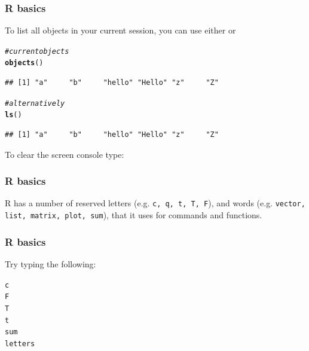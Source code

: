 \documentclass[12pt]{beamer}\usepackage[]{graphicx}\usepackage[]{color}
\makeatletter
\newcommand{\hlcom}[1]{\textcolor[rgb]{0.678,0.584,0.686}{\textit{#1}}}%
\newcommand{\hlstd}[1]{\textcolor[rgb]{0.345,0.345,0.345}{#1}}%
\newcommand{\hlkwd}[1]{\textcolor[rgb]{0.737,0.353,0.396}{\textbf{#1}}}%
\newenvironment{kframe}{%
 \def\at@end@of@kframe{}%
 \ifinner\ifhmode%
  \def\at@end@of@kframe{\end{minipage}}%
  \begin{minipage}{\columnwidth}%
 \fi\fi%
 \def\FrameCommand##1{\hskip\@totalleftmargin \hskip-\fboxsep
 \colorbox{shadecolor}{##1}\hskip-\fboxsep
     \hskip-\linewidth \hskip-\@totalleftmargin \hskip\columnwidth}%
 \MakeFramed {\advance\hsize-\width
   \@totalleftmargin\z@ \linewidth\hsize
   \@setminipage}}%
 {\par\unskip\endMakeFramed%
 \at@end@of@kframe}
\newenvironment{knitrout}{}{} %
\makeatother
\begin{document}

\begin{frame}[fragile]
\frametitle{R basics}

To list all objects in your current session, you can use either  or 
\begin{knitrout}\footnotesize
{}\color{fgcolor}\begin{kframe}
\begin{alltt}
\hlcom{# current objects}
\hlkwd{objects}\hlstd{()}
\end{alltt}
\begin{verbatim}
## [1] "a"     "b"     "hello" "Hello" "z"     "Z"
\end{verbatim}
\begin{alltt}
\hlcom{# alternatively}
\hlkwd{ls}\hlstd{()}
\end{alltt}
\begin{verbatim}
## [1] "a"     "b"     "hello" "Hello" "z"     "Z"
\end{verbatim}
\end{kframe}
\end{knitrout}

To clear the screen console type: 

\end{frame}


\begin{frame}
\frametitle{R basics}

R has a number of reserved letters (e.g. \texttt{c, q, t, T, F}), and words (e.g. \texttt{vector, list, matrix, plot, sum}), that it uses for commands and functions.
\eb

\end{frame}


\begin{frame}[fragile]
\frametitle{R basics}

Try typing the following:
\begin{knitrout}\footnotesize
{}\color{fgcolor}\begin{kframe}
\begin{alltt}
\hlstd{c}
\hlstd{F}
\hlstd{T}
\hlstd{t}
\hlstd{sum}
\hlstd{letters}
\end{alltt}
\end{kframe}
\end{knitrout}

\end{frame}
\end{document}
